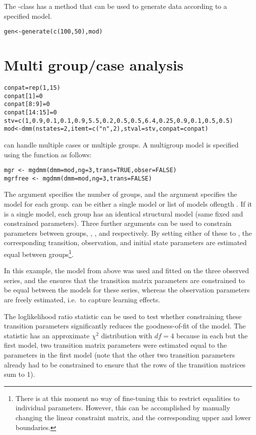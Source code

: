 The -class has a  method that can be used to 
generate data according to a specified model. 

\begin{verbatim}
gen<-generate(c(100,50),mod)
\end{verbatim}


\section{Multi group/case analysis}

\begin{verbatim}
conpat=rep(1,15)
conpat[1]=0
conpat[8:9]=0
conpat[14:15]=0
stv=c(1,0.9,0.1,0.1,0.9,5.5,0.2,0.5,0.5,6.4,0.25,0.9,0.1,0.5,0.5)
mod<-dmm(nstates=2,itemt=c("n",2),stval=stv,conpat=conpat)
\end{verbatim}

 can handle multiple cases or multiple groups. A
multigroup model is specified using the function  as
follows:

\begin{verbatim}
mgr <- mgdmm(dmm=mod,ng=3,trans=TRUE,obser=FALSE)
mgrfree <- mgdmm(dmm=mod,ng=3,trans=FALSE)
\end{verbatim}

The  argument specifies the number of groups, and the
 argument specifies the model for each group.  
can be either a single model or list of models oflength .  If
it is a single model, each group has an identical structural model
(same fixed and constrained parameters).  Three further arguments can
be used to constrain parameters between groups, ,
, and  respectively.  By setting either of
these to , the corresponding transition, observation, and
initial state parameters are estimated equal between
groups\footnote{There is at this moment no way of fine-tuning this to
restrict equalities to individual parameters.  However, this can be
accomplished by manually changing the linear constraint matrix, and
the corresponding upper and lower boundaries.}.

In this example, the model from above was used and fitted on the three
observed series, and the  ensures that the transition
matrix parameters are constrained to be equal between the models for
these series, whereas the observation parameters are freely estimated,
i.e.\ to capture learning effects. 

The loglikelihood ratio statistic can be used to test whether
constraining these transition parameters significantly reduces the
goodness-of-fit of the model.  The statistic has an approximate
$\chi^{2}$ distribution with $df=4$ because in each but the first
model, two transition matrix parameters were estimated equal to the
parameters in the first model (note that the other two transition
parameters already had to be constrained to ensure that the rows of
the transition matrices sum to 1).


